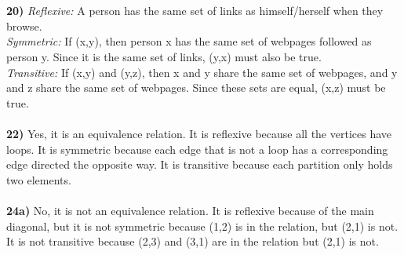\documentclass{article}
\begin{document}
\\\\
\textbf{20)} \textit{Reflexive:} A person has the same set of links as himself/herself when they browse. \\ \textit{Symmetric:} If (x,y), then person x has the same set of webpages followed as person y. Since it is the same set of links, (y,x) must also be true. \\ \textit{Transitive:} If (x,y) and (y,z), then x and y share the same set of webpages, and y and z share the same set of webpages. Since these sets are equal, (x,z) must be true.
\\\\
\textbf{22)} Yes, it is an equivalence relation. It is reflexive because all the vertices have loops. It is symmetric because each edge that is not a loop has a corresponding edge directed the opposite way. It is transitive because each partition only holds two elements.
\\\\
\textbf{24a)} No, it is not an equivalence relation. It is reflexive because of the main diagonal, but it is not symmetric because (1,2) is in the relation, but (2,1) is not. It is not transitive because (2,3) and (3,1) are in the relation but (2,1) is not.
\\\\
\end{document}
